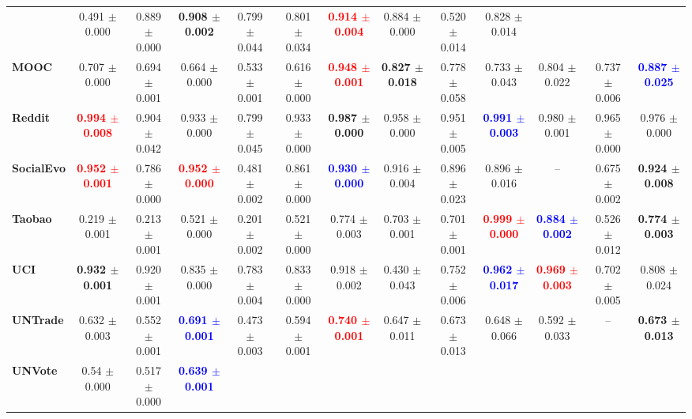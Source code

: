 {\begin{tabular}{lccccc|ccccccc}
& 0.491 $\pm$ 0.000 
& 0.889 $\pm$ 0.000 
& \textbf{0.908 $\pm$ 0.002 }
& 0.799 $\pm$ 0.044 
& 0.801 $\pm$ 0.034 
& \textcolor{red}{\textbf{0.914 $\pm$ 0.004 }}
& 0.884 $\pm$ 0.000 
& 0.520 $\pm$ 0.014 
& 0.828 $\pm$ 0.014  \\
\textbf{MOOC} 
& 0.707 $\pm$ 0.000 
& 0.694 $\pm$ 0.001 
& 0.664 $\pm$ 0.000 
& 0.533 $\pm$ 0.001 
& 0.616 $\pm$ 0.000 
& \textcolor{red}{\textbf{0.948 $\pm$ 0.001 }} 
& \textbf{0.827 $\pm$ 0.018 } 
& 0.778 $\pm$ 0.058 
& 0.733 $\pm$ 0.043 
& 0.804 $\pm$ 0.022 
& 0.737 $\pm$ 0.006 
& \textcolor{blue}{\textbf{0.887 $\pm$ 0.025 }} \\
\textbf{Reddit} 
& \textcolor{red}{\textbf{0.994 $\pm$ 0.008 }}
& 0.904 $\pm$ 0.042 
& 0.933 $\pm$ 0.000 
& 0.799 $\pm$ 0.045 
& 0.933 $\pm$ 0.000 
& \textbf{0.987 $\pm$ 0.000 }
& 0.958 $\pm$ 0.000 
& 0.951 $\pm$ 0.005 
& \textcolor{blue}{\textbf{0.991 $\pm$ 0.003 }}
& 0.980 $\pm$ 0.001 
& 0.965 $\pm$ 0.000 
& 0.976 $\pm$ 0.000  \\
\textbf{SocialEvo} 
& \textcolor{red}{\textbf{0.952 $\pm$ 0.001 }}
& 0.786 $\pm$ 0.000 
& \textcolor{red}{\textbf{0.952 $\pm$ 0.000 }}
& 0.481 $\pm$ 0.002 
& 0.861 $\pm$ 0.000 
& \textcolor{blue}{\textbf{0.930 $\pm$ 0.000 }}
& 0.916 $\pm$ 0.004 
& 0.896 $\pm$ 0.023 
& 0.896 $\pm$ 0.016 
& -- 
& 0.675 $\pm$ 0.002 
& \textbf{0.924 $\pm$ 0.008 } \\
\textbf{Taobao} 
& 0.219 $\pm$ 0.001 
& 0.213 $\pm$ 0.001 
& 0.521 $\pm$ 0.000 
& 0.201 $\pm$ 0.002 
& 0.521 $\pm$ 0.000 
& 0.774 $\pm$ 0.003 
& 0.703 $\pm$ 0.001 
& 0.701 $\pm$ 0.001 
& \textcolor{red}{\textbf{0.999 $\pm$ 0.000 }}
& \textcolor{blue}{\textbf{0.884 $\pm$ 0.002 }}
& 0.526 $\pm$ 0.012 
& \textbf{0.774 $\pm$ 0.003 } \\
\textbf{UCI} 
& \textbf{0.932 $\pm$ 0.001 }
& 0.920 $\pm$ 0.001 
& 0.835 $\pm$ 0.000 
& 0.783 $\pm$ 0.004 
& 0.833 $\pm$ 0.000 
& 0.918 $\pm$ 0.002 
& 0.430 $\pm$ 0.043 
& 0.752 $\pm$ 0.006 
& \textcolor{blue}{\textbf{0.962 $\pm$ 0.017 }}
& \textcolor{red}{\textbf{0.969 $\pm$ 0.003 }}
& 0.702 $\pm$ 0.005 
& 0.808 $\pm$ 0.024 \\
\textbf{UNTrade} 
& 0.632 $\pm$ 0.003
& 0.552 $\pm$ 0.001 
& \textcolor{blue}{\textbf{0.691 $\pm$ 0.001 }}
& 0.473 $\pm$ 0.003 
& 0.594 $\pm$ 0.001 
& \textcolor{red}{\textbf{0.740 $\pm$ 0.001 }}
& 0.647 $\pm$ 0.011 
& 0.673 $\pm$ 0.013 
& 0.648 $\pm$ 0.066 
& 0.592 $\pm$ 0.033 
& -- 
& \textbf{0.673 $\pm$ 0.013 } \\
\textbf{UNVote} 
& 0.54 $\pm$ 0.000 
& 0.517 $\pm$ 0.000 
& \textcolor{blue}{\textbf{0.639 $\pm$ 0.001 }}

\end{tabular}}
